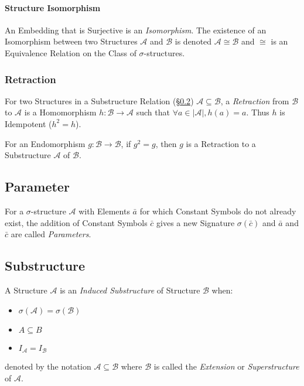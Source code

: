 \paragraph{Structure Isomorphism}\label{sec:structure_isomorphism}\hfill

An Embedding that is Surjective is an \emph{Isomorphism}. The
existence of an Isomorphism between two Structures $\mathcal{A}$ and
$\mathcal{B}$ is denoted $\mathcal{A} \cong \mathcal{B}$ and $\cong$
is an Equivalence Relation on the Class of $\sigma$-structures.



\subsubsection{Retraction}\label{sec:retraction}

For two Structures in a Substructure Relation
(\S\ref{sec:substructure}) $\mathcal{A} \subseteq \mathcal{B}$, a
\emph{Retraction} from $\mathcal{B}$ to $\mathcal{A}$ is a
Homomorphism $h : \mathcal{B} \rightarrow \mathcal{A}$ such that
$\forall a \in |\mathcal{A}|, h(a) = a$. Thus $h$ is Idempotent ($h^2
= h$).

For an Endomorphism $g : \mathcal{B} \rightarrow \mathcal{B}$, if $g^2
= g$, then $g$ is a Retraction to a Substructure $\mathcal{A}$ of
$\mathcal{B}$.



\subsection{Parameter}\label{sec:parameter}

For a $\sigma$-structure $\mathcal{A}$ with Elements $\bar{a}$ for
which Constant Symbols do not already exist, the addition of Constant
Symbols $\bar{c}$ gives a new Signature $\sigma(\bar{c})$ and
$\bar{a}$ and $\bar{c}$ are called \emph{Parameters}.



\subsection{Substructure}\label{sec:substructure}

A Structure $\mathcal{A}$ is an \emph{Induced Substructure} of
Structure $\mathcal{B}$ when:
\begin{itemize}
  \item $\sigma(\mathcal{A}) = \sigma(\mathcal{B})$
  \item $A \subseteq B$
  \item $I_{\mathcal{A}}=I_{\mathcal{B}}$
\end{itemize}
denoted by the notation $\mathcal{A} \subseteq \mathcal{B}$ where
$\mathcal{B}$ is called the \emph{Extension} or \emph{Superstructure}
of $\mathcal{A}$.

